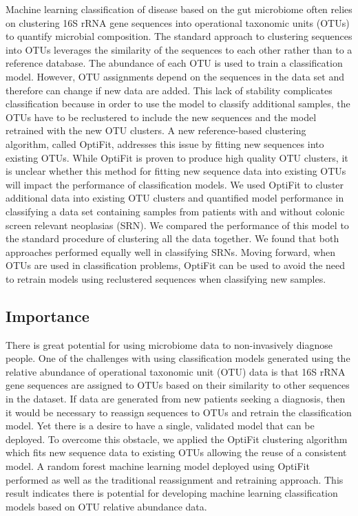 \documentclass[
]{article}
\begin{document}
Machine learning classification of disease based on the gut microbiome
often relies on clustering 16S rRNA gene sequences into operational
taxonomic units (OTUs) to quantify microbial composition. The standard
approach to clustering sequences into OTUs leverages the similarity of
the sequences to each other rather than to a reference database. The
abundance of each OTU is used to train a classification model. However,
OTU assignments depend on the sequences in the data set and therefore
can change if new data are added. This lack of stability complicates
classification because in order to use the model to classify additional
samples, the OTUs have to be reclustered to include the new sequences
and the model retrained with the new OTU clusters. A new reference-based
clustering algorithm, called OptiFit, addresses this issue by fitting
new sequences into existing OTUs. While OptiFit is proven to produce
high quality OTU clusters, it is unclear whether this method for fitting
new sequence data into existing OTUs will impact the performance of
classification models. We used OptiFit to cluster additional data into
existing OTU clusters and quantified model performance in classifying a
data set containing samples from patients with and without colonic
screen relevant neoplasias (SRN). We compared the performance of this
model to the standard procedure of clustering all the data together. We
found that both approaches performed equally well in classifying SRNs.
Moving forward, when OTUs are used in classification problems, OptiFit
can be used to avoid the need to retrain models using reclustered
sequences when classifying new samples.

\hypertarget{importance}{%
\subsection{Importance}\label{importance}}

There is great potential for using microbiome data to non-invasively
diagnose people. One of the challenges with using classification models
generated using the relative abundance of operational taxonomic unit
(OTU) data is that 16S rRNA gene sequences are assigned to OTUs based on
their similarity to other sequences in the dataset. If data are
generated from new patients seeking a diagnosis, then it would be
necessary to reassign sequences to OTUs and retrain the classification
model. Yet there is a desire to have a single, validated model that can
be deployed. To overcome this obstacle, we applied the OptiFit
clustering algorithm which fits new sequence data to existing OTUs
allowing the reuse of a consistent model. A random forest machine
learning model deployed using OptiFit performed as well as the
traditional reassignment and retraining approach. This result indicates
there is potential for developing machine learning classification models
based on OTU relative abundance data.
\end{document}
